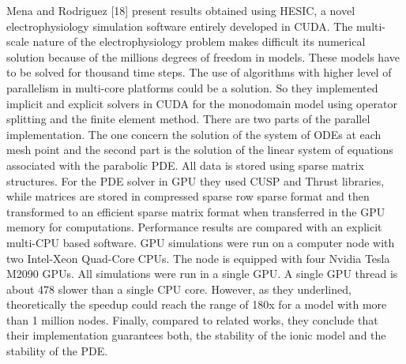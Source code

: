 Mena and Rodriguez [18] present results obtained using HESIC, a novel electrophysiology simulation software entirely developed in CUDA. The multi-scale nature of the electrophysiology problem makes difficult its numerical solution because of the millions degrees of freedom in models. These models have to be solved for thousand time steps. The use of algorithms with higher level of parallelism in multi-core platforms could be a solution. So they implemented implicit and explicit solvers in CUDA for the monodomain model using operator splitting and the finite element method. There are two parts of the parallel implementation. The one concern the solution of the system of ODEs at each mesh point and the second part is the solution of the linear system of equations associated with the parabolic PDE. All data is stored using sparse matrix structures. For the PDE solver in GPU they used CUSP and Thrust libraries, while matrices are stored in compressed sparse row sparse format and then transformed to an efficient sparse matrix format when transferred in the GPU memory for computations. Performance results are compared with an explicit multi-CPU based software. GPU simulations were run on a computer node with two Intel-Xeon Quad-Core CPUs. The node is equipped with four Nvidia Tesla M2090 GPUs. All simulations were run in a single GPU. A single GPU thread is about 478 slower than a single CPU core. However, as they underlined, theoretically the speedup could reach the range of 180x for a model with more than 1 million nodes. Finally, compared to related works, they conclude that their implementation guarantees both, the stability of the ionic model and the stability of the PDE.


